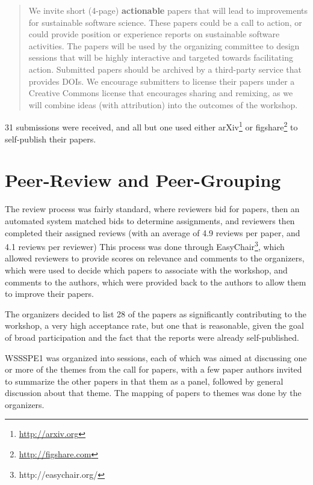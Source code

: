 \documentclass[11pt, oneside]{amsart}
\begin{document}
\begin{quote}
We invite short (4-page) \textbf{actionable} papers that will lead to improvements for sustainable software science. These papers could be a call to action, or could provide position or experience reports on sustainable software activities. The papers will be used by the organizing committee to design sessions that will be highly interactive and targeted towards facilitating action. Submitted papers should be archived by a third-party service that provides DOIs. We encourage submitters to license their papers under a Creative Commons license that encourages sharing and remixing, as we will combine ideas (with attribution) into the outcomes of the workshop.\end{quote}

31 submissions were received, and all but one used either arXiv\footnote{\url{http://arxiv.org}} or figshare\footnote{\url{http://figshare.com}} to self-publish their papers.  

\section{Peer-Review and Peer-Grouping}

The review process was fairly standard, where reviewers bid for papers, then an automated system
matched bids to determine assignments, and reviewers then completed their assigned
reviews (with an average of 4.9 reviews per paper, and 4.1 reviews per reviewer)
This process was done through EasyChair\footnote{http://easychair.org/}, which allowed reviewers to provide scores on relevance and comments to the organizers, which were used to decide which papers to associate with the workshop, and comments to the authors, which were provided back to the authors to allow them to improve their papers.

The organizers decided to list 28 of the papers as significantly contributing to the workshop, a very high acceptance rate, but one that is reasonable, given the goal of broad participation and the fact that the reports were already self-published.

WSSSPE1 was organized into sessions, each of which was aimed at discussing one or more of the themes from the call for papers, with a few paper authors invited to summarize the other papers in that them as a panel, followed by general discussion about that theme.  The mapping of papers to themes was done by the organizers.
\end{document}
